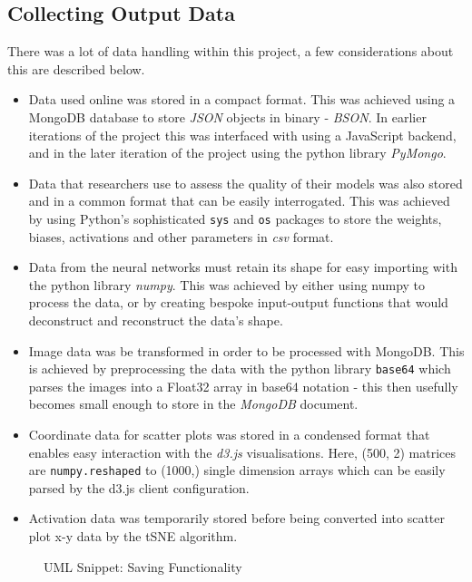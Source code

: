 \documentclass[a4paper,11pt,titlepage]{article}
\begin{document}
\subsection{Collecting Output Data}
	There was a lot of data handling within this project, a few considerations about this are described below.
	\begin{itemize}
		\item Data used online was stored in a compact format. This was achieved using a MongoDB database to store \textit{JSON} objects in binary - \textit{BSON}. In earlier iterations of the project this was interfaced with using a JavaScript backend, and in the later iteration of the project using the python library \textit{PyMongo}.
		\item Data that researchers use to assess the quality of their models was also stored and in a common format that can be easily interrogated. This was achieved by using Python's sophisticated \texttt{sys} and \texttt{os} packages to store the weights, biases, activations and other parameters in \textit{csv} format.
		\item Data from the neural networks must retain its shape for easy importing with the python library \textit{numpy}. This was achieved by either using numpy to process the data, or by creating bespoke input-output functions that would deconstruct and reconstruct the data's shape.
		\item Image data was be transformed in order to be processed with MongoDB. This is achieved by preprocessing the data with the python library \texttt{base64} which parses the images into a Float32 array in base64 notation - this then usefully becomes small enough to store in the \textit{MongoDB} document.
		\item Coordinate data for scatter plots was stored in a condensed format that enables easy interaction with the \textit{d3.js} visualisations. Here, (500, 2) matrices are \texttt{numpy.reshaped} to (1000,) single dimension arrays which can be easily parsed by the d3.js client configuration.
		\item Activation data was temporarily stored before being converted into scatter plot x-y data by the tSNE algorithm.
	\end{itemize}
		
	\begin{figure}[H]
    			\caption{UML Snippet: Saving Functionality}%
	\end{figure}		
	
\end{document}
